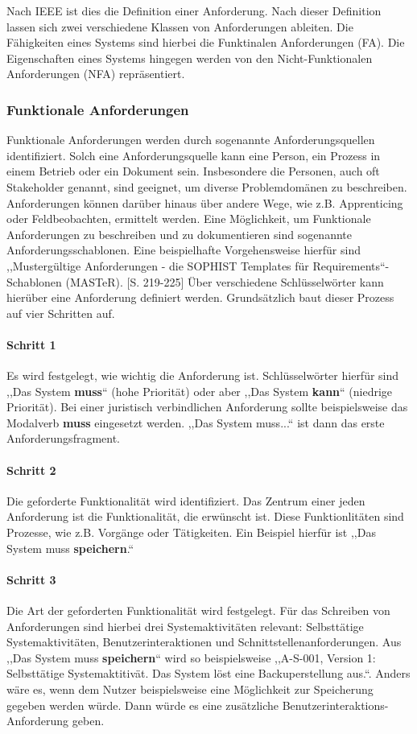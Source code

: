 Nach IEEE ist dies die Definition einer Anforderung. Nach dieser Definition lassen sich zwei verschiedene Klassen von Anforderungen ableiten. Die Fähigkeiten eines Systems sind hierbei die Funktinalen Anforderungen (FA).
Die Eigenschaften eines Systems hingegen werden von den Nicht-Funktionalen Anforderungen (NFA) repräsentiert.

\subsubsection{Funktionale Anforderungen}
Funktionale Anforderungen werden durch sogenannte Anforderungsquellen identifiziert. Solch eine Anforderungsquelle kann eine Person, ein Prozess in einem Betrieb oder ein Dokument sein.
Insbesondere die Personen, auch oft Stakeholder genannt, sind geeignet, um diverse Problemdomänen zu beschreiben. Anforderungen können darüber hinaus über andere Wege, wie z.B.
Apprenticing oder Feldbeobachten, ermittelt werden.
Eine Möglichkeit, um Funktionale Anforderungen zu beschreiben und zu dokumentieren sind sogenannte Anforderungsschablonen. 
Eine beispielhafte Vorgehensweise hierfür sind ,,Mustergültige Anforderungen - die SOPHIST Templates für Requirements``-Schablonen (MASTeR). \cite{rupp}[S. 219-225]
Über verschiedene Schlüsselwörter kann hierüber eine Anforderung definiert werden. Grundsätzlich baut dieser Prozess auf vier Schritten auf.

\paragraph{Schritt 1}
Es wird festgelegt, wie wichtig die Anforderung ist. Schlüsselwörter hierfür sind ,,Das System \textbf{muss}`` (hohe Priorität) oder aber ,,Das System \textbf{kann}`` (niedrige Priorität).
Bei einer juristisch verbindlichen Anforderung sollte beispielsweise das Modalverb \textbf{muss} eingesetzt werden. ,,Das System muss...`` ist dann das erste Anforderungsfragment.

\paragraph{Schritt 2}
Die geforderte Funktionalität wird identifiziert. Das Zentrum einer jeden Anforderung ist die Funktionalität, die erwünscht ist. Diese Funktionlitäten sind Prozesse, wie z.B. Vorgänge
oder Tätigkeiten. Ein Beispiel hierfür ist ,,Das System muss \textbf{speichern}.``

\paragraph{Schritt 3}
Die Art der geforderten Funktionalität wird festgelegt. Für das Schreiben von Anforderungen sind hierbei drei Systemaktivitäten relevant: Selbsttätige Systemaktivitäten, 
Benutzerinteraktionen und Schnittstellenanforderungen. Aus ,,Das System muss \textbf{speichern}`` wird so beispielsweise ,,A-S-001, Version 1: Selbsttätige Systemaktitivät. Das
System löst eine Backuperstellung aus.``. Anders wäre es, wenn dem Nutzer beispielsweise eine Möglichkeit zur Speicherung gegeben werden würde. Dann würde es eine zusätzliche
Benutzerinteraktions-Anforderung geben.

